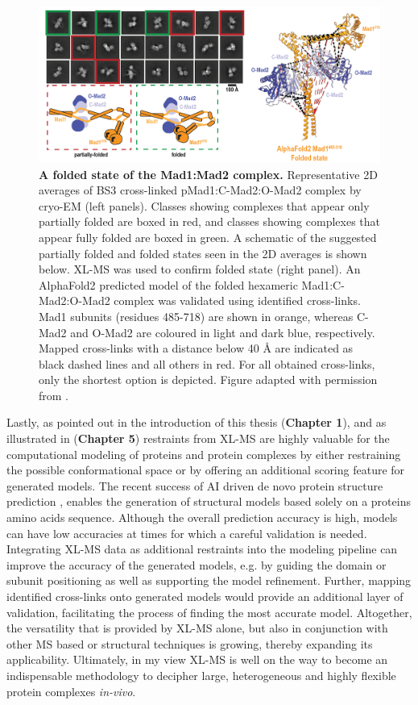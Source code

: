 \begin{figure}[htb!]
    \center
    \includegraphics[width=\textwidth]{Chapter.6/Figures/Figure3.png}
    \caption{\textbf{A folded state of the Mad1:Mad2 complex.} Representative 2D averages of BS3 cross-linked pMad1:C-Mad2:O-Mad2 complex by cryo-EM (left panels). Classes showing complexes that appear only partially folded are boxed in red, and classes showing complexes that appear fully folded are boxed in green. A schematic of the suggested partially folded and folded states seen in the 2D averages is shown below. XL-MS was used to confirm folded state (right panel). An AlphaFold2 predicted model of the folded hexameric Mad1:C-Mad2:O-Mad2 complex was validated using identified cross-links. Mad1 subunits (residues 485-718) are shown in orange, whereas C-Mad2 and O-Mad2 are coloured in light and dark blue, respectively. Mapped cross-links with a distance below 40 Å are indicated as black dashed lines and all others in red. For all obtained cross-links, only the shortest option is depicted. Figure adapted with permission from \cite{RN45}.}
    \label{fig:ch6_fig3}
\end{figure}
Lastly, as pointed out in the introduction of this thesis (\textbf{Chapter 1}), and as illustrated in (\textbf{Chapter 5}) restraints from XL-MS are highly valuable for the computational modeling of proteins and protein complexes by either restraining the possible conformational space or by offering an additional scoring feature for generated models. The recent success of AI driven de novo protein structure prediction \cite{RN5, RN4}, enables the generation of structural models based solely on a proteins amino acids sequence. Although the overall prediction accuracy is high, models can have low accuracies at times for which a careful validation is needed. Integrating XL-MS data as additional restraints into the modeling pipeline can improve the accuracy of the generated models, e.g. by guiding the domain or subunit positioning as well as supporting the model refinement. Further, mapping identified cross-links onto generated models would provide an additional layer of validation, facilitating the process of finding the most accurate model.
Altogether, the versatility that is provided by XL-MS alone, but also in conjunction with other MS based or structural techniques is growing, thereby expanding its applicability. Ultimately, in my view XL-MS is well on the way to become an indispensable methodology to decipher large, heterogeneous and highly flexible protein complexes \emph{in-vivo}.
%
